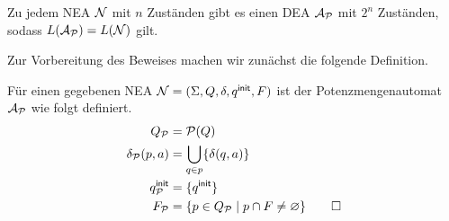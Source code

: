 \begin{Satz}\label{satz:2.rabinscott}
	Zu jedem \ac{NEA} $\mathcal{N}$ mit $n$ Zuständen gibt es einen \ac{DEA} $\mathcal{A}_{\mathcal{P}}$ mit $2^n$ Zuständen, sodass $L(\mathcal{A}_{\mathcal{P}})=L(\mathcal{N})$ gilt.
\end{Satz}
  Zur Vorbereitung des Beweises machen wir zunächst die folgende Definition.

\begin{Def}[Potenzmengenautomat]
 Für einen gegebenen \ac{NEA}  $\mathcal{N}= (\Sigma, Q,\delta,q^\mathsf{init},F)$ ist der Potenzmengenautomat $\mathcal{A}_{\mathcal{P}}$ wie folgt definiert.
         \begin{align*}
                Q_{\mathcal{P}} &= \mathcal{P}(Q)\\
                \delta_{\mathcal{P}}(p,a) &= \bigcup_{q\in p} \{\delta(q,a)\}\\
                q^\mathsf{init}_{\mathcal{P}} &= \{q^\mathsf{init}\}\\
                F_{\mathcal{P}} &= \{ p\in Q_{\mathcal{P}} \mid p\cap F\neq \varnothing \}
                \qedhere
        \end{align*}
\end{Def}
